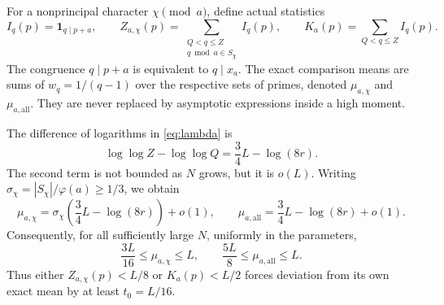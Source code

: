 \documentclass[11pt]{article}
\theoremstyle{remark}\newtheorem{remark}[theorem]{Remark}
\newcommand{\one}{\mathbf 1}
\begin{document}
For a nonprincipal character $\chi\pmod a$, define actual statistics
\begin{equation}\label{eq:statistics}
 I_q(p)=\one_{q\mid p+a},\qquad
 Z_{a,\chi}(p)=\sum_{\substack{Q<q\le Z\\q\bmod a\in S_\chi}}I_q(p),
 \qquad K_a(p)=\sum_{Q<q\le Z}I_q(p).
\end{equation}
The congruence $q\mid p+a$ is equivalent to $q\mid x_a$.
The exact comparison means are sums of $w_q=1/(q-1)$ over the respective
sets of primes, denoted $\mu_{a,\chi}$ and $\mu_{a,\mathrm{all}}$.
They are never replaced by asymptotic expressions inside a high moment.

The difference of logarithms in \eqref{eq:lambda} is
\begin{equation}\label{eq:log-window}
 \log\log Z-\log\log Q=\frac34L-\log(8r).
\end{equation}
The second term is not bounded as $N$ grows, but it is $o(L)$.
Writing $\sigma_\chi=|S_\chi|/\varphi(a)\ge1/3$, we obtain
\[
 \mu_{a,\chi}=\sigma_\chi\left(\frac34L-\log(8r)\right)+o(1),
 \qquad
 \mu_{a,\mathrm{all}}=\frac34L-\log(8r)+o(1).
\]
Consequently, for all sufficiently large $N$, uniformly in the parameters,
\begin{equation}\label{eq:mean-bounds}
 \frac{3L}{16}\le\mu_{a,\chi}\le L,
 \qquad \frac{5L}{8}\le\mu_{a,\mathrm{all}}\le L.
\end{equation}
Thus either $Z_{a,\chi}(p)<L/8$ or $K_a(p)<L/2$ forces deviation
from its own exact mean by at least $t_0=L/16$.
\end{document}
